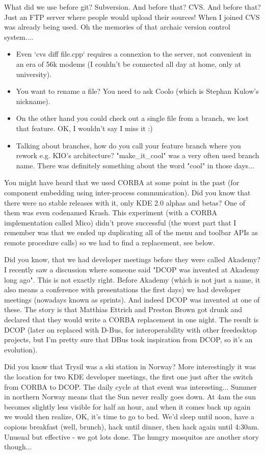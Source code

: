 What did we use before git? Subversion. And before that? CVS. And before that? Just an FTP server where people would upload their sources!
When I joined CVS was already being used. Oh the memories of that archaic version control system....
\begin{itemize}
 \item Even `cvs diff file.cpp` requires a connexion to the server, not convenient in an era of 56k modems (I couldn't be connected all day at home, only at university).
 \item You want to rename a file? You need to ask Coolo (which is Stephan Kulow's nickname).
 \item On the other hand you could check out a single file from a branch, we lost that feature. OK, I wouldn't say I miss it :)
 \item Talking about branches, how do you call your feature branch where you rework e.g. KIO's architecture? "make\_it\_cool" was a very often used branch name. There was definitely something about the word "cool" in those days...
\end{itemize}

You might have heard that we used CORBA at some point in the past (for component embedding using inter-process communication). Did you know that there were no stable releases with it, only KDE 2.0 alphas and betas? One of them was even codenamed Krash. This experiment (with a CORBA implementation called Mico) didn't prove successful (the worst part that I remember was that we ended up duplicating all of the menu and toolbar APIs as remote procedure calls) so we had to find a replacement, see below.

Did you know, that we had developer meetings before they were called Akademy? I recently saw a discussion where someone said "DCOP was invented at Akademy long ago". This is not exactly right. Before Akademy (which is not just a name, it also means a conference with presentations the first days) we had developer meetings (nowadays known as sprints). And indeed DCOP was invented at one of these. 
The story is that Matthias Ettrich and Preston Brown got drunk and declared that they would write a CORBA replacement in one night. The result is DCOP (later on replaced with D-Bus, for interoperability with other freedesktop projects, but I'm pretty sure that DBus took inspiration from DCOP, so it's an evolution).

Did you know that Trysil was a ski station in Norway? More interestingly it was the location for two KDE developer meetings, the first one just after the switch from CORBA to DCOP.
The daily cycle at that event was interesting... Summer in northern Norway means that the Sun never really goes down. At 4am the sun becomes slightly less visible for half an hour, and when it comes back up again we would then realize, OK, it's time to go to bed. We'd sleep until noon, have a copious breakfast (well, brunch), hack until dinner, then hack again until 4:30am. Unusual but effective - we got lots done. The hungry mosquitos are another story though...

